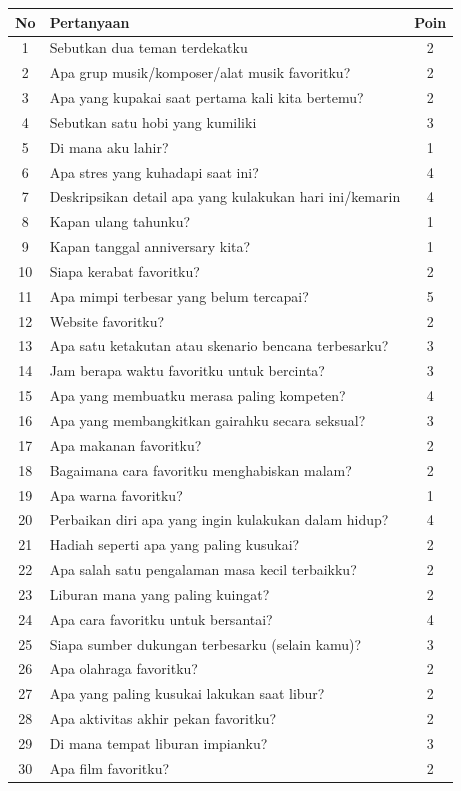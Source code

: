 \begin{center}
\renewcommand{\arraystretch}{1.3}
\begin{tabular}{|c|l|c|}
\hline
\rowcolor{primary!20}
\textbf{No} & \textbf{Pertanyaan} & \textbf{Poin} \\
\hline
1 & Sebutkan dua teman terdekatku & 2 \\
\hline
2 & Apa grup musik/komposer/alat musik favoritku? & 2 \\
\hline
3 & Apa yang kupakai saat pertama kali kita bertemu? & 2 \\
\hline
4 & Sebutkan satu hobi yang kumiliki & 3 \\
\hline
5 & Di mana aku lahir? & 1 \\
\hline
6 & Apa stres yang kuhadapi saat ini? & 4 \\
\hline
7 & Deskripsikan detail apa yang kulakukan hari ini/kemarin & 4 \\
\hline
8 & Kapan ulang tahunku? & 1 \\
\hline
9 & Kapan tanggal anniversary kita? & 1 \\
\hline
10 & Siapa kerabat favoritku? & 2 \\
\hline
11 & Apa mimpi terbesar yang belum tercapai? & 5 \\
\hline
12 & Website favoritku? & 2 \\
\hline
13 & Apa satu ketakutan atau skenario bencana terbesarku? & 3 \\
\hline
14 & Jam berapa waktu favoritku untuk bercinta? & 3 \\
\hline
15 & Apa yang membuatku merasa paling kompeten? & 4 \\
\hline
16 & Apa yang membangkitkan gairahku secara seksual? & 3 \\
\hline
17 & Apa makanan favoritku? & 2 \\
\hline
18 & Bagaimana cara favoritku menghabiskan malam? & 2 \\
\hline
19 & Apa warna favoritku? & 1 \\
\hline
20 & Perbaikan diri apa yang ingin kulakukan dalam hidup? & 4 \\
\hline
21 & Hadiah seperti apa yang paling kusukai? & 2 \\
\hline
22 & Apa salah satu pengalaman masa kecil terbaikku? & 2 \\
\hline
23 & Liburan mana yang paling kuingat? & 2 \\
\hline
24 & Apa cara favoritku untuk bersantai? & 4 \\
\hline
25 & Siapa sumber dukungan terbesarku (selain kamu)? & 3 \\
\hline
26 & Apa olahraga favoritku? & 2 \\
\hline
27 & Apa yang paling kusukai lakukan saat libur? & 2 \\
\hline
28 & Apa aktivitas akhir pekan favoritku? & 2 \\
\hline
29 & Di mana tempat liburan impianku? & 3 \\
\hline
30 & Apa film favoritku? & 2 \\
\hline
\end{tabular}
\end{center}

